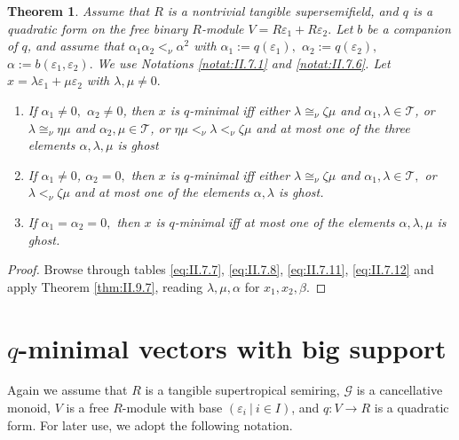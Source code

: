 \documentclass [12pt,a4paper,reqno]{amsart}
\newtheorem{thm}{Theorem} [section]
\begin{document}
\begin{thm}\label{thm:II.9.9}
Assume that $R$ is a nontrivial tangible supersemifield, and $q$ is a quadratic form on the free binary $R$-module
$V=R{\varepsilon}_1+R{\varepsilon}_2.$ Let $b$ be a companion of $q$, and assume that ${\alpha} _1{\alpha} _2<_\nu{\alpha} ^2$ with
${\alpha} _1:=q({\varepsilon}_1),$ ${\alpha} _2:=q({\varepsilon}_2),$ ${\alpha} :=b({\varepsilon}_1,{\varepsilon}_2).$ We use Notations
\ref{notat:II.7.1} and \ref{notat:II.7.6}. Let $x={\lambda} {\varepsilon}_1+\mu{\varepsilon}_2$ with ${\lambda} ,\mu\ne0.$
\begin{enumerate}
\item[i)] If ${\alpha} _1\ne0,$ ${\alpha} _2\ne0$, then $x$ is $q$-minimal iff either ${\lambda} \cong_\nu\zeta\mu$ and
${\alpha} _1, {\lambda} \in{\mathcal T}$, or ${\lambda} \cong_\nu\eta\mu$ and ${\alpha} _2 ,\mu\in{\mathcal T}$, or
$\eta\mu<_\nu{\lambda} <_\nu\zeta\mu$ and at most one of the three elements ${\alpha} ,{\lambda} ,\mu$ is ghost
{\vskip 1.5mm \noindent}

\item[ii)] If ${\alpha} _1\ne0$, ${\alpha} _2=0,$ then $x$ is $q$-minimal iff either ${\lambda} \cong_\nu\zeta\mu$ and
${\alpha} _1,{\lambda} \in{\mathcal T},$ or ${\lambda} <_\nu\zeta\mu$ and at most one of the elements ${\alpha} ,{\lambda} $ is
ghost.
{\vskip 1.5mm \noindent}
\item[iii)] If ${\alpha} _1={\alpha} _2=0,$ then $x$ is $q$-minimal iff at most one of the elements ${\alpha} ,{\lambda} ,\mu$ is
ghost.
\end{enumerate}
\end{thm}

\begin{proof} Browse through tables \eqref{eq:II.7.7}, \eqref{eq:II.7.8}, \eqref{eq:II.7.11}, \eqref{eq:II.7.12} and apply Theorem \ref{thm:II.9.7}, reading ${\lambda}, \mu, {\alpha}$ for $x_1, x_2, {\beta}$.
\end{proof}

\section{$q$-minimal vectors with big support}\label{sec:7}

Again we assume that $R$ is a tangible supertropical semiring, ${\mathcal G}$ is a cancellative monoid,  $V$ is
a free $R$-module with base $({\varepsilon}_i {\ {|} \ }i\in I)$,  and $q:V\to
R$ is a quadratic form. For later use, we adopt the following
notation.
\end{document}
